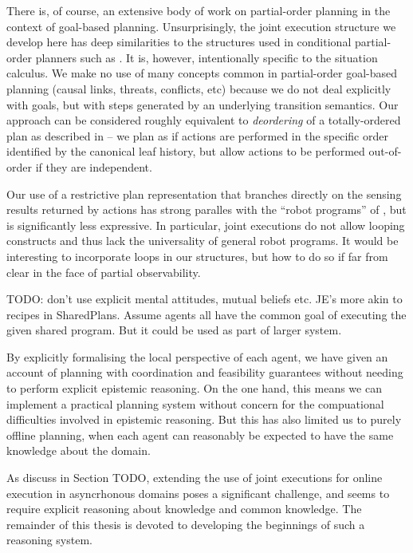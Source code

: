 There is, of course, an extensive body of work on partial-order planning
in the context of goal-based planning. Unsurprisingly, the joint execution
structure we develop here has deep similarities to the structures
used in conditional partial-order planners such as \citep{peot92conditional_nonlinear}.
It is, however, intentionally specific to the situation calculus.
We make no use of many concepts common in partial-order goal-based
planning (causal links, threats, conflicts, etc) because we do not
deal explicitly with goals, but with steps generated by an underlying
transition semantics. Our approach can be considered roughly equivalent
to \emph{deordering} of a totally-ordered plan as described in \citep{backstrom99reordering}
-- we plan as if actions are performed in the specific order identified
by the canonical leaf history, but allow actions to be performed out-of-order
if they are independent.

Our use of a restrictive plan representation that branches directly
on the sensing results returned by actions has strong paralles with
the {}``robot programs'' of \citep{levesque96what_is_planning,levesque05planning_with_loops},
but is significantly less expressive. In particular, joint executions
do not allow looping constructs and thus lack the universality of
general robot programs. It would be interesting to incorporate loops
in our structures, but how to do so if far from clear in the face
of partial observability.

TODO: don't use explicit mental attitudes, mutual beliefs etc. JE's
more akin to recipes in SharedPlans. Assume agents all have the common
goal of executing the given shared program. But it could be used as
part of larger system.

By explicitly formalising the local perspective of each agent, we
have given an account of planning with coordination and feasibility
guarantees without needing to perform explicit epistemic reasoning.
On the one hand, this means we can implement a practical planning
system without concern for the compuational difficulties involved
in epistemic reasoning. But this has also limited us to purely offline
planning, when each agent can reasonably be expected to have the same
knowledge about the domain.

As discuss in Section TODO, extending the use of joint executions
for online execution in asyncrhonous domains poses a significant challenge,
and seems to require explicit reasoning about knowledge and common
knowledge. The remainder of this thesis is devoted to developing the
beginnings of such a reasoning system.

